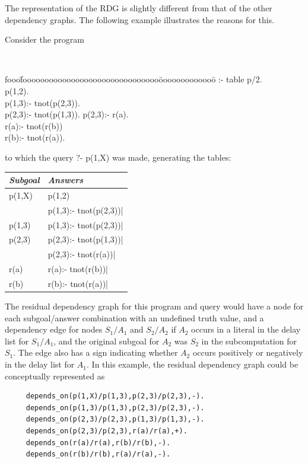 The representation of the RDG is slightly different from that of the
other dependency graphs.  The following example illustrates the
reasons for this.

\begin{example}\label{ex:rdg} \rm 
Consider the program 
% 
{\tt 
\begin{tabbing}
fooo\=fooooooooooooooooooooooooooooooo\=ooooooooooooo\=\kill
 \>  :- table p/2. \\
\>           p(1,2). \\
\>           p(1,3):- tnot(p(2,3)).  \\
\>           p(2,3):- tnot(p(1,3)). \> p(2,3):- r(a).\\
\>           r(a):- tnot(r(b)) \\
\>           r(b):- tnot(r(a)).   
\end{tabbing}
}
%
to which the query {?- p(1,X)} was made, generating the tables:
\begin{center}
\begin{tabular}{||l|l||}   \hline
     {\em Subgoal}                 & {\em Answers} \\ \hline \hline
     p(1,X)                     & p(1,2) \\ 
                                & p(1,3):- tnot(p(2,3))| \\ \hline
     p(1,3)                     & p(1,3):- tnot(p(2,3))| \\ \hline
     p(2,3)                     & p(2,3):- tnot(p(1,3))| \\ \hline
                                & p(2,3):- tnot(r(a))| \\ \hline
     r(a)                       & r(a):- tnot(r(b))| \\ \hline
     r(b)                       & r(b):- tnot(r(a))| \\ \hline
\end{tabular}
\end{center}

The residual dependency graph for this program and query would have a
node for each subgoal/answer combination with an undefined truth
value, and a dependency edge for nodes $S_1/A_1$ and $S_2/A_2$ if
$A_2$ occurs in a literal in the delay list for $S_1/A_1$, and the
original subgoal for $A_2$ was $S_2$ in the subcomputation for $S_1$.
The edge also has a sign indicating whether $A_2$ occurs positively or
negatively in the delay list for $A_1$.  In this example, the residual
dependency graph could be conceptually represented as 
%
\begin{verbatim}
     depends_on(p(1,X)/p(1,3),p(2,3)/p(2,3),-).
     depends_on(p(1,3)/p(1,3),p(2,3)/p(2,3),-).
     depends_on(p(2,3)/p(2,3),p(1,3)/p(1,3),-).
     depends_on(p(2,3)/p(2,3),r(a)/r(a),+).
     depends_on(r(a)/r(a),r(b)/r(b),-).
     depends_on(r(b)/r(b),r(a)/r(a),-).
\end{verbatim}
\end{example}

